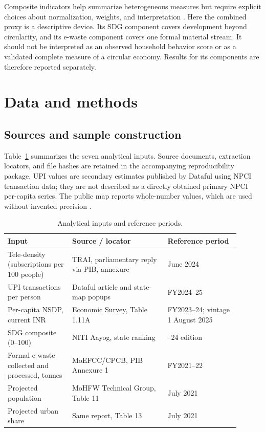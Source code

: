 \documentclass[11pt,a4paper]{article}
\begin{document}
Composite indicators help summarize heterogeneous measures but require explicit choices about normalization, weights, and interpretation \cite{oecd}. Here the combined proxy is a descriptive device. Its SDG component covers development beyond circularity, and its e-waste component covers one formal material stream. It should not be interpreted as an observed household behavior score or as a validated complete measure of a circular economy. Results for its components are therefore reported separately.

\section{Data and methods}
\subsection{Sources and sample construction}
Table~\ref{tab:sources} summarizes the seven analytical inputs. Source documents, extraction locators, and file hashes are retained in the accompanying reproducibility package. UPI values are secondary estimates published by Dataful using NPCI transaction data; they are not described as a directly obtained primary NPCI per-capita series. The public map reports whole-number values, which are used without invented precision \cite{dataful}.

\begin{table}[htbp]
\centering\small
\caption{Analytical inputs and reference periods.}\label{tab:sources}
\begin{tabular}{@{}>{\raggedright\arraybackslash}p{0.25\linewidth}>{\raggedright\arraybackslash}p{0.37\linewidth}>{\raggedright\arraybackslash}p{0.28\linewidth}@{}}
\toprule Input & Source / locator & Reference period \\
\midrule
Tele-density (subscriptions per 100 people) & TRAI, parliamentary reply via PIB, annexure \cite{trai} & 30 June 2024 \\
UPI transactions per person & Dataful article and state-map popups \cite{dataful} & FY2024--25 \\
Per-capita NSDP, current INR & Economic Survey, Table 1.11A \cite{nsdp} & FY2023--24; vintage 1 August 2025 \\
SDG composite (0--100) & NITI Aayog, state ranking \cite{sdg} & 2023--24 edition \\
Formal e-waste collected and processed, tonnes & MoEFCC/CPCB, PIB Annexure 1 \cite{cpcb} & FY2021--22 \\
Projected population & MoHFW Technical Group, Table 11 \cite{population} & 1 July 2021 \\
Projected urban share & Same report, Table 13 \cite{population} & 1 July 2021 \\
\bottomrule
\end{tabular}
\end{table}
\end{document}
